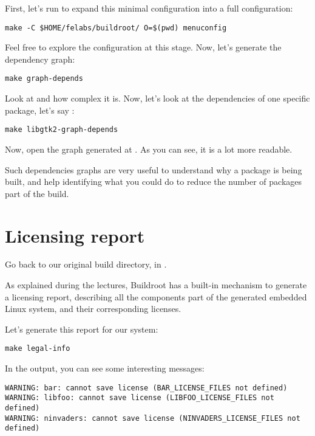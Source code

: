 First, let's run  to expand this minimal
configuration into a full configuration:

\begin{verbatim}
make -C $HOME/felabs/buildroot/ O=$(pwd) menuconfig
\end{verbatim}

Feel free to explore the configuration at this stage. Now, let's
generate the dependency graph:

\begin{verbatim}
make graph-depends
\end{verbatim}

Look at  and how complex it is. Now,
let's look at the dependencies of one specific package, let's say
:

\begin{verbatim}
make libgtk2-graph-depends
\end{verbatim}

Now, open the graph generated at
. As you can see, it is a lot
more readable.

Such dependencies graphs are very useful to understand why a package
is being built, and help identifying what you could do to reduce the
number of packages part of the build.

\section{Licensing report}

Go back to our original build directory, in
.

As explained during the lectures, Buildroot has a built-in mechanism
to generate a licensing report, describing all the components part of
the generated embedded Linux system, and their corresponding licenses.

Let's generate this report for our system:

\begin{verbatim}
make legal-info
\end{verbatim}

In the output, you can see some interesting messages:

\begin{verbatim}
WARNING: bar: cannot save license (BAR_LICENSE_FILES not defined)
WARNING: libfoo: cannot save license (LIBFOO_LICENSE_FILES not defined)
WARNING: ninvaders: cannot save license (NINVADERS_LICENSE_FILES not defined)
\end{verbatim}

